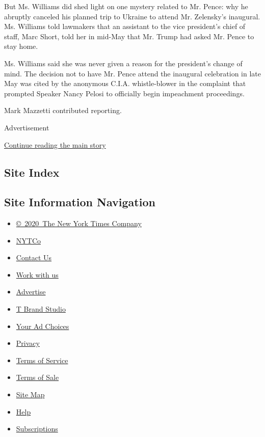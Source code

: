 But Ms. Williams did shed light on one mystery related to Mr. Pence: why
he abruptly canceled his planned trip to Ukraine to attend Mr.
Zelensky's inaugural. Ms. Williams told lawmakers that an assistant to
the vice president's chief of staff, Marc Short, told her in mid-May
that Mr. Trump had asked Mr. Pence to stay home.

Ms. Williams said she was never given a reason for the president's
change of mind. The decision not to have Mr. Pence attend the inaugural
celebration in late May was cited by the anonymous C.I.A. whistle-blower
in the complaint that prompted Speaker Nancy Pelosi to officially begin
impeachment proceedings.

Mark Mazzetti contributed reporting.

Advertisement

\protect\hyperlink{after-bottom}{Continue reading the main story}

\hypertarget{site-index}{%
\subsection{Site Index}\label{site-index}}

\hypertarget{site-information-navigation}{%
\subsection{Site Information
Navigation}\label{site-information-navigation}}

\begin{itemize}
\tightlist
\item
  \href{https://help.nytimes.com/hc/en-us/articles/115014792127-Copyright-notice}{©~2020~The
  New York Times Company}
\end{itemize}

\begin{itemize}
\tightlist
\item
  \href{https://www.nytco.com/}{NYTCo}
\item
  \href{https://help.nytimes.com/hc/en-us/articles/115015385887-Contact-Us}{Contact
  Us}
\item
  \href{https://www.nytco.com/careers/}{Work with us}
\item
  \href{https://nytmediakit.com/}{Advertise}
\item
  \href{http://www.tbrandstudio.com/}{T Brand Studio}
\item
  \href{https://www.nytimes.com/privacy/cookie-policy\#how-do-i-manage-trackers}{Your
  Ad Choices}
\item
  \href{https://www.nytimes.com/privacy}{Privacy}
\item
  \href{https://help.nytimes.com/hc/en-us/articles/115014893428-Terms-of-service}{Terms
  of Service}
\item
  \href{https://help.nytimes.com/hc/en-us/articles/115014893968-Terms-of-sale}{Terms
  of Sale}
\item
  \href{https://spiderbites.nytimes.com}{Site Map}
\item
  \href{https://help.nytimes.com/hc/en-us}{Help}
\item
  \href{https://www.nytimes.com/subscription?campaignId=37WXW}{Subscriptions}
\end{itemize}
